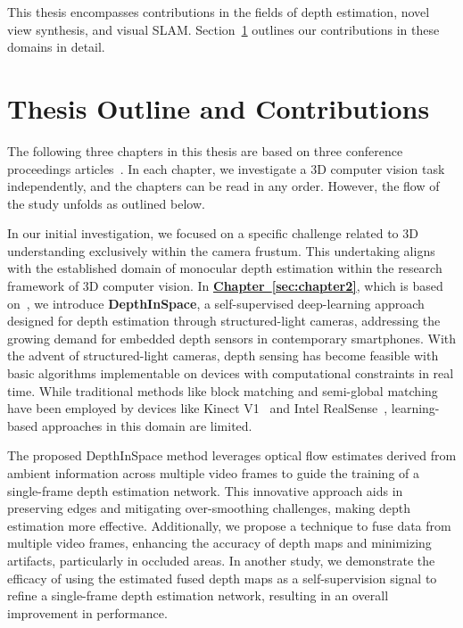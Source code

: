 This thesis encompasses contributions in the fields of depth estimation, novel view synthesis, and visual SLAM. Section~\ref{sec:c1_outline} outlines our contributions in these domains in detail.

\section{Thesis Outline and Contributions} \label{sec:c1_outline}

The following three chapters in this thesis are based on three conference proceedings articles~\citep{johari2021depthinspace,johari2022geonerf, johari2023eslam}. In each chapter, we investigate a 3D computer vision task independently, and the chapters can be read in any order. However, the flow of the study unfolds as outlined below.

In our initial investigation, we focused on a specific challenge related to 3D understanding exclusively within the camera frustum. This undertaking aligns with the established domain of monocular depth estimation within the research framework of 3D computer vision. In \textbf{\hyperref[sec:chapter2]{Chapter~\ref{sec:chapter2}}}, which is based on~\cite{johari2021depthinspace}, we introduce \textbf{DepthInSpace}, a self-supervised deep-learning approach designed for depth estimation through structured-light cameras, addressing the growing demand for embedded depth sensors in contemporary smartphones. With the advent of structured-light cameras, depth sensing has become feasible with basic algorithms implementable on devices with computational constraints in real time. While traditional methods like block matching and semi-global matching have been employed by devices like Kinect V1~\citep{martinez2013kinect} and Intel RealSense~\citep{keselman2017intel}, learning-based approaches in this domain are limited.

The proposed DepthInSpace method leverages optical flow estimates derived from ambient information across multiple video frames to guide the training of a single-frame depth estimation network. This innovative approach aids in preserving edges and mitigating over-smoothing challenges, making depth estimation more effective. Additionally, we propose a technique to fuse data from multiple video frames, enhancing the accuracy of depth maps and minimizing artifacts, particularly in occluded areas. In another study, we demonstrate the efficacy of using the estimated fused depth maps as a self-supervision signal to refine a single-frame depth estimation network, resulting in an overall improvement in performance.

